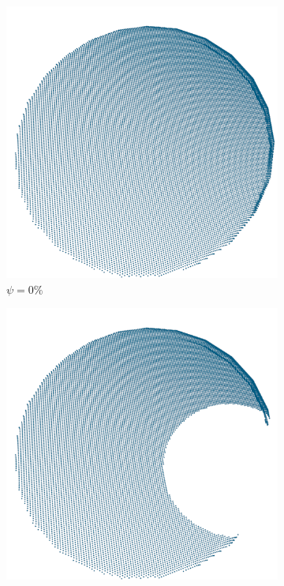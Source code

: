 \begin{figure}[!b]
	\centering
	\hfill
	\begin{subfigure}{0.32\textwidth}
		\centering
		\includegraphics[width=\linewidth]{Figures/ObjRecog/occlusion_0}
		\caption{$\psi=0\%$}
		\label{subfig:objrecog:occlusion:0}
	\end{subfigure}
	\hfill
	\begin{subfigure}{0.32\textwidth}
		\centering
		\includegraphics[width=\linewidth]{Figures/ObjRecog/occlusion_25}

\end{subfigure}
\end{figure}
